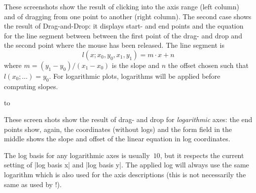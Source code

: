 	\nobreak
	These screenshots show the result of clicking into the axis range (left column) and of dragging from one point to another (right column). The second case shows the result of Drag-and-Drop: it displays start- and end points and the equation for the line segment between between the first point of the drag- and drop and the second point where the mouse has been released. The line segment is 
	\[ l(x; x_0,y_0,x_1,y_1) = m \cdot x + n \]
	where $m = (y_1-y_0) / (x_1-x_0)$ is the slope and $n$ the offset chosen such that $l(x_0;\dotsc) = y_0$. For logarithmic plots, logarithms will be applied before computing slopes. 

	\noindent
	\hbox to %

	\nobreak
	These screen shots show the result of drag- and drop for \emph{logarithmic} axes: the end points show, again, the coordinates (without logs) and the form field in the middle shows the slope and offset of the linear equation in log coordinates.

	The log basis for any logarithmic axes is usually~$10$, but it respects the current setting of |log basis x| and |log basis y|. The applied log will always use the same logarithm which is also used for the axis descriptions (this is not necessarily the same as used by \PGFPlotstable!).

